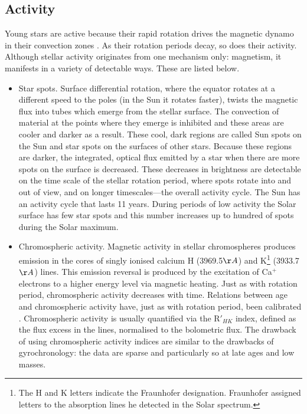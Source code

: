 \subsection{Activity}
Young stars are active because their rapid rotation drives the magnetic dynamo
in their convection zones \citep{Noyes1984}.
As their rotation periods decay, so does their activity.
Although stellar activity originates from one mechanism only: magnetism,
it manifests in a variety of detectable ways.
These are listed below.
\begin{itemize}
\item{Star spots.
Surface differential rotation, where the equator rotates at a different speed
to the poles (in the Sun it rotates faster), twists the magnetic flux into
tubes which emerge from the stellar surface.
The convection of material at the points where they emerge is inhibited and
these areas are cooler and darker as a result.
These cool, dark regions are called Sun spots on the Sun and star spots on the
surfaces of other stars.
Because these regions are darker, the integrated, optical flux emitted by a
star when there are more spots on the surface is decreased.
These decreases in brightness are detectable on the time scale of the stellar
rotation period, where spots rotate into and out of view, and on longer
timescales---the overall activity cycle.
The Sun has an activity cycle that lasts 11 years.
During periods of low activity the Solar surface has few star spots and this
number increases up to hundred of spots during the Solar maximum.}
\item{Chromospheric activity.
Magnetic activity in stellar chromospheres produces emission in the cores of
singly ionised calcium H (3969.5$\AA$) and K\footnote{The H and K letters
indicate the Fraunhofer designation. Fraunhofer assigned letters to the
absorption lines
he detected in the Solar spectrum.}
(3933.7$\AA$) lines.
This emission reversal is produced by the excitation of Ca$^+$ electrons to a
higher energy level via magnetic heating.
Just as with rotation period, chromospheric activity decreases with time.
Relations between age and chromospheric activity have, just as with rotation
period, been calibrated \citep[\eg][]{Soderblom1991, Donahue1993,
Lachaume1999, Mamajek2008}.
Chromospheric activity is usually quantified via the R$\prime_{HK}$ index,
defined as the flux excess in the lines, normalised to the bolometric flux.
The drawback of using chromospheric activity indices are similar to the
drawbacks of gyrochronology: the data are sparse and particularly so at late
ages and low masses.
}
\end{itemize}
